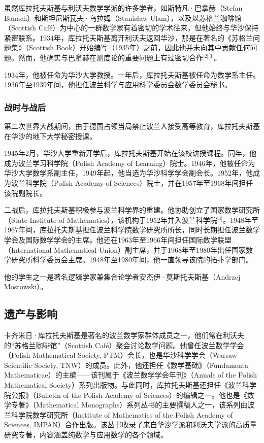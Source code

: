 虽然库拉托夫斯基与利沃夫数学学派的许多学者，如斯特凡·巴拿赫（Stefan Banach）和斯坦尼斯瓦夫·乌拉姆（Stanisław Ulam），以及以苏格兰咖啡馆（Scottish Café）为中心的一群数学家有着密切的学术往来，但他始终与华沙保持紧密联系。1934年，库拉托夫斯基离开利沃夫返回华沙，那是在著名的《苏格兰问题集》（Scottish Book）开始编写（1935年）之前，因此他并未向其中贡献任何问题。然而，他确实与巴拿赫在测度论的重要问题上有过密切合作\(^\text{[2][3]}\)。

1934年，他被任命为华沙大学教授。一年后，库拉托夫斯基被任命为数学系主任。1936年至1939年间，他担任波兰科学与应用科学委员会数学委员会秘书。
\subsubsection{战时与战后}
第二次世界大战期间，由于德国占领当局禁止波兰人接受高等教育，库拉托夫斯基在华沙的地下大学秘密授课。

1945年2月，华沙大学重新开学后，库拉托夫斯基开始在该校讲授课程。同年，他成为波兰学习科学院（Polish Academy of Learning）院士。1946年，他被任命为华沙大学数学系副主任，1949年起，他当选为华沙科学学会副会长。1952年，他成为波兰科学院（Polish Academy of Sciences）院士，并在1957年至1968年间担任该院副院长。

二战后，库拉托夫斯基积极参与波兰科学界的重建。他协助创立了国家数学研究所（State Institute of Mathematics），该机构于1952年并入波兰科学院\(^\text{[4]}\)。1948年至1967年间，库拉托夫斯基担任波兰科学院数学研究所所长，同时长期担任波兰数学学会及国际数学学会的主席。他还在1963年至1966年间担任国际数学联盟（International Mathematical Union）副主席，并于1968年至1980年出任国家数学研究所科学委员会主席。1948年至1980年间，他一直领导该院的拓扑学部门。

他的学生之一是著名逻辑学家兼集合论学者安杰伊·莫斯托夫斯基（Andrzej Mostowski）。
\subsection{遗产与影响}
卡齐米日·库拉托夫斯基是著名的波兰数学家群体成员之一，他们常在利沃夫的“苏格兰咖啡馆”（Scottish Café）聚会讨论数学问题。他曾任波兰数学学会（Polish Mathematical Society, PTM）会长，也是华沙科学学会（Warsaw Scientific Society, TNW）的成员。此外，他还担任《数学基础》（Fundamenta Mathematicae）的主编——该刊属于《波兰数学学会年刊》（Annals of the Polish Mathematical Society）系列出版物。与此同时，库拉托夫斯基还担任《波兰科学院公报》（Bulletin of the Polish Academy of Sciences）的编辑之一。他也是《数学专著》（Mathematical Monographs）系列丛书的主要撰稿人之一，该系列由波兰科学院数学研究所（Institute of Mathematics of the Polish Academy of Sciences, IMPAN）合作出版。该丛书收录了来自华沙学派和利沃夫学派的高质量研究专著，内容涵盖纯数学与应用数学的各个领域。

